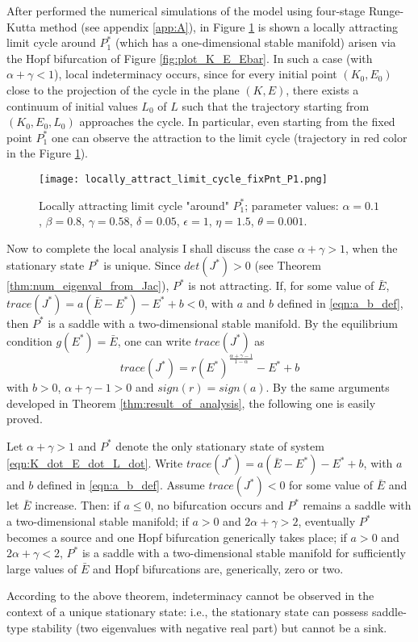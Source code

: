 After performed the numerical simulations of the model using four-stage Runge-Kutta method (see appendix \ref{app:A}), in Figure \ref{fig:local_attract_lim_cycle_P1} is shown a locally attracting limit cycle around $P_1^*$ (which has a one-dimensional stable manifold) arisen via the Hopf bifurcation of Figure \ref{fig:plot_K_E_Ebar}. In such a case (with $\alpha+\gamma<1$), local indeterminacy occurs, since for every initial point $(K_0,E_0)$ close to the projection of the cycle in the plane $(K,E)$, there exists a continuum of initial values $L_0$ of $L$ such that the trajectory starting from $(K_0,E_0,L_0)$ approaches the cycle. In particular, even starting from the fixed point  $P_1^*$ one can observe the attraction to the limit cycle (trajectory in red color in the Figure \ref{fig:local_attract_lim_cycle_P1}).
\begin{figure}[h!]
	\centering
	\texttt{[image: locally\_attract\_limit\_cycle\_fixPnt\_P1.png]}
	\caption{Locally attracting limit cycle "around" $P_1^*$; parameter values: $\alpha=0.1$, $\beta=0.8$, $\gamma=0.58$, $\delta=0.05$, $\epsilon=1$, $\eta=1.5$, $\theta=0.001$.}
	\label{fig:local_attract_lim_cycle_P1}
\end{figure}

Now to complete the local analysis I shall discuss the case $\alpha+\gamma>1$, when the stationary state $P^*$ is unique. Since $det(J^*) > 0$ (see Theorem \ref{thm:num_eigenval_from_Jac}), $P^*$ is not attracting. If, for some value of $\bar{E}$, $trace(J^*)=a(\bar{E}-E^*)-E^*+b<0$, with $a$ and $b$ defined in \eqref{eqn:a_b_def}, then $P^*$ is a saddle with a two-dimensional stable manifold. By the equilibrium condition $g(E^*)=\bar{E}$, one can write $trace(J^*)$ as
$$trace(J^*)=r(E^*)^{\frac{\alpha+\gamma-1}{1-\alpha}}-E^*+b$$
with $b>0$, $\alpha+\gamma-1>0$ and $sign(r)=sign(a)$. 
By the same arguments developed in Theorem \ref{thm:result_of_analysis}, the following one is easily proved.
\begin{thm} \label{thm:5_no_indeter_with_unique_fixPnt}
	Let $\alpha+\gamma>1$ and $P^*$ denote the only stationary state of system \eqref{eqn:K_dot_E_dot_L_dot}. Write $trace(J^*)=a(\bar{E}-E^*)-E^*+b$, with $a$ and $b$ defined in \eqref{eqn:a_b_def}. Assume $trace(J^*) < 0$ for some value of $\bar{E}$ and let $\bar{E}$ increase. Then: if $a\leq0$, no bifurcation occurs and $P^*$ remains a saddle with a two-dimensional stable manifold; if $a>0$ and $2\alpha+\gamma>2$, eventually $P^*$ becomes a source and one Hopf bifurcation generically takes place; if $a>0$ and $2\alpha+\gamma<2$, $P^*$ is a saddle with a two-dimensional stable manifold for sufficiently large values of $\bar{E}$ and Hopf bifurcations are, generically, zero or two.
\end{thm}
According to the above theorem, indeterminacy cannot be observed in the context of a unique stationary state: i.e., the stationary state can possess saddle-type stability (two eigenvalues with negative real part) but cannot be a sink.